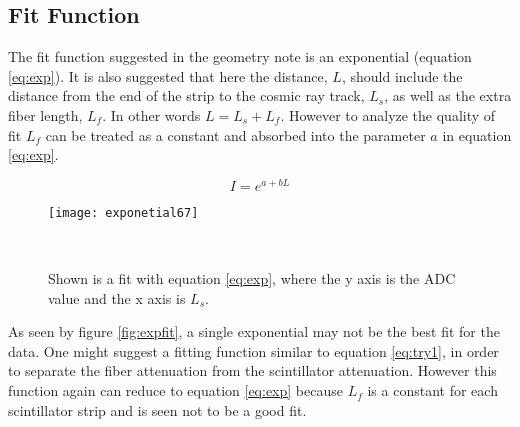 \FloatBarrier









\FloatBarrier
\subsection{Fit Function}
\FloatBarrier
The fit function suggested in the geometry note is an  exponential (equation \ref{eq:exp}).
It is also suggested that here the distance, $L$, should include the distance from the end of the strip 
to the cosmic ray track, $L_{s}$, as well as the extra fiber length, $L_{f}$.
In other words $L = L_{s} + L_{f}$.
However to analyze the quality of fit $L_{f}$ can be treated as a constant and absorbed into the parameter 
$a$ in equation \ref{eq:exp}.

\begin{equation}
    I = e^{a + bL}
    \label{eq:exp}
\end{equation}

\begin{figure}[h]
    \centering
        \texttt{[image: exponetial67]}
        \caption{Shown is a fit with equation \ref{eq:exp}, where the y axis is the ADC value and the x axis is $L_{s}$.}
        \label{fig:exponential67}
    ~
\end{figure}

As seen by figure \ref{fig:expfit}, a single exponential may not be the best fit for the data.
One might suggest a fitting function similar to equation \ref{eq:try1}, in order to separate the fiber 
attenuation from the scintillator attenuation.
However this function again can reduce to equation \ref{eq:exp} because $L_{f}$ is a constant for each 
scintillator strip and is seen not to be a good fit.


